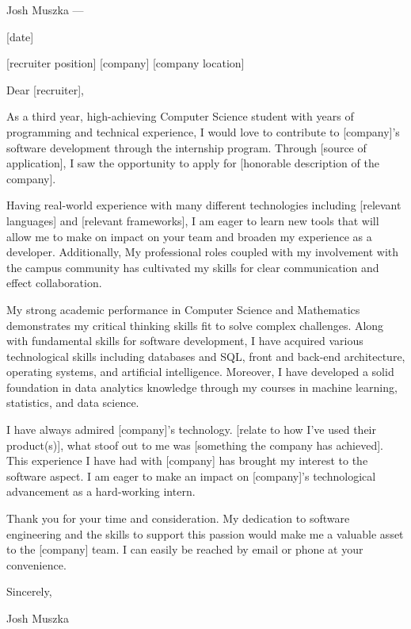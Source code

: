 \documentclass[11pt]{article}
\begin{document}
Josh Muszka
---

[date]

[recruiter position]
[company]
[company location]

Dear [recruiter],

As a third year, high-achieving Computer Science student with years of programming and technical experience, I would love to contribute to [company]'s software development through the internship program. Through [source of application], I saw the opportunity to apply for [honorable description of the company].

Having real-world experience with many different technologies including [relevant languages] and [relevant frameworks], I am eager to learn new tools that will allow me to make on impact on your team and broaden my experience as a developer. Additionally, My professional roles coupled with my involvement with the campus community has cultivated my skills for clear communication and effect collaboration.

My strong academic performance in Computer Science and Mathematics demonstrates my critical thinking skills fit to solve complex challenges. Along with fundamental skills for software development, I have acquired various technological skills including databases and SQL, front and back-end architecture, operating systems, and artificial intelligence. Moreover, I have developed a solid foundation in data analytics knowledge through my courses in machine learning, statistics, and data science.

I have always admired [company]'s technology. [relate to how I've used their product(s)], what stoof out to me was [something the company has achieved]. This experience I have had with [company] has brought my interest to the software aspect. I am eager to make an impact on [company]'s technological advancement as a hard-working intern.

Thank you for your time and consideration. My dedication to software engineering and the skills to support this passion would make me a valuable asset to the [company] team. I can easily be reached by email or phone at your convenience.

Sincerely,

Josh Muszka
\end{document}
